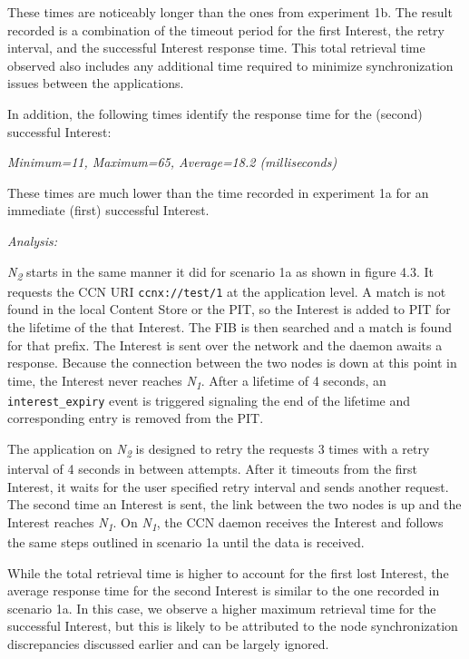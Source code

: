\documentclass[a4paper,12pt]{report}      %
\begin{document}
These times are noticeably longer than the ones from experiment 1b. The result recorded is a combination of the timeout period for
the first Interest, the retry interval, and the successful Interest response time. This total retrieval time observed also includes any additional time required to minimize synchronization issues between the applications.

In addition, the following times identify the response time for the (second) successful Interest:
\begin{center}\textsl{Minimum=11, Maximum=65, Average=18.2 (milliseconds)}\end{center}
These times are much lower than the time recorded in experiment 1a for an immediate (first) successful
Interest.

\vspace*{1\baselineskip}\noindent\emph{Analysis:}

 \emph{N\textsubscript{2}} starts in the same manner it did for scenario 1a as shown in figure 4.3. It requests the CCN URI
\verb!ccnx://test/1! at the application level. A match is not found in the local Content Store or the PIT, so
the Interest is added to PIT for the lifetime of the that Interest. 
The FIB is then searched and a match is found for that prefix. The Interest is sent over the network and
the daemon awaits a response. Because the connection between the two nodes is down at this point in
time, the Interest never reaches  \emph{N\textsubscript{1}}. After a lifetime of 4 seconds, an \verb!interest_expiry!
 event is triggered signaling the end of the lifetime and corresponding entry is removed from the PIT.

The application on \emph{N\textsubscript{2}} is designed to retry the requests 3 times with a retry interval of 4 seconds in
between attempts. After it timeouts from the first Interest, it waits for the user specified retry
interval and sends another request. The second time an Interest is sent, the link between the two
nodes is up and the Interest reaches \emph{N\textsubscript{1}}. On \emph{N\textsubscript{1}}, the CCN daemon receives the Interest and follows the same steps outlined in scenario 1a until the data is received. 

While the total retrieval time is higher to account for the first lost Interest, the average response time for the second Interest is similar to the one recorded in scenario 1a. In this case, we observe a higher maximum retrieval time for the successful Interest, but this is likely to be attributed to the node synchronization discrepancies discussed earlier and can be largely ignored.
\end{document}
